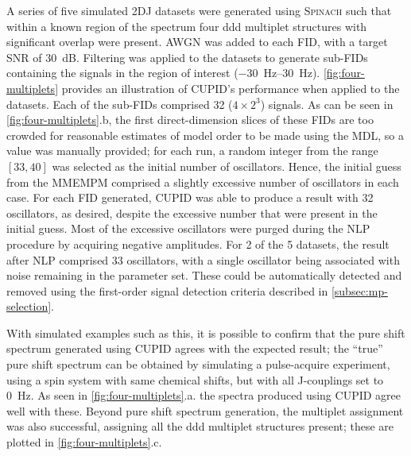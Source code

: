 A series of five simulated \ac{2DJ} datasets
were generated using \textsc{Spinach} such that within a
known region of the spectrum four ddd multiplet
structures with significant overlap were present. \ac{AWGN} was added to each
\ac{FID}, with a target \ac{SNR} of \qty{30}{\deci\bel}.
Filtering was applied to the datasets to generate sub-\acp{FID} containing the
signals in the region of interest
(\SIrange{-30}{30}{\hertz}).
\cref{fig:four-multiplets} provides an illustration of \ac{CUPID}'s performance
when applied to the datasets.
Each of the sub-\acp{FID} comprised 32 ($4 \times 2^3$) signals.
As can be seen in \cref{fig:four-multiplets}.b, the first direct-dimension
slices of these \acp{FID} are too crowded for reasonable estimates of model
order to be made using the \ac{MDL}, so a value was manually provided; for each
run, a random
integer from the range $[33, 40]$ was selected as the initial number of
oscillators. Hence, the initial guess from the \ac{MMEMPM} comprised a
slightly excessive number of oscillators in each case.
For each \ac{FID} generated, \ac{CUPID} was able to produce a
result with 32 oscillators, as desired, despite the excessive number
that were present in the initial guess. Most of the excessive oscillators were
purged during the \ac{NLP} procedure by acquiring negative amplitudes.
For 2 of the 5 datasets, the result after \ac{NLP} comprised 33
oscillators, with a single oscillator being associated with noise remaining in
the parameter set. These could be
automatically detected and removed using the first-order signal detection
criteria described in \cref{subsec:mp-selection}.

With simulated examples such as this, it is possible to confirm that the pure
shift spectrum generated using \ac{CUPID} agrees with the expected result; the
``true'' pure shift spectrum can be obtained by simulating a pulse-acquire
experiment, using a spin system with same chemical shifts, but with all J-couplings
set to \qty{0}{\hertz}. As seen in \cref{fig:four-multiplets}.a. the spectra
produced using \ac{CUPID} agree well with these. Beyond pure shift spectrum
generation, the multiplet assignment was also successful, assigning all the ddd
multiplet structures present; these are plotted in \cref{fig:four-multiplets}.c.

